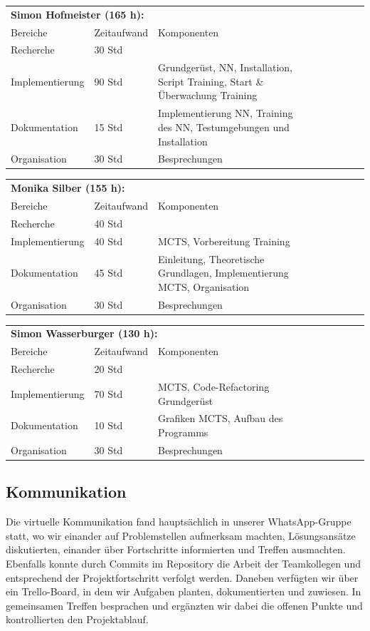 \documentclass[12pt,a4paper]{article}
\begin{document}
\begin{tabular}{*{3}{p{4cm}p{3cm}p{8cm}}}
\multicolumn{3}{l}{\textbf{Simon Hofmeister (165 h):}} \\
Bereiche & Zeitaufwand & Komponenten \\
\cline{1-3}
Recherche & 30 Std &  \\
Implementierung & 90 Std & Grundgerüst, NN, Installation, Script Training, Start \& Überwachung Training  \\
Dokumentation & 15 Std & Implementierung NN, Training des NN, Testumgebungen und Installation \\
Organisation & 30 Std &  Besprechungen\\
\end{tabular}


\begin{tabular}{*{3}{p{4cm}p{3cm}p{8cm}}}
\multicolumn{3}{l}{\textbf{Monika Silber (155 h):}} \\
Bereiche & Zeitaufwand & Komponenten \\
\cline{1-3}
Recherche & 40 Std &  \\
Implementierung & 40 Std & MCTS, Vorbereitung Training  \\
Dokumentation & 45 Std &  Einleitung, Theoretische Grundlagen, Implementierung MCTS, Organisation \\
Organisation & 30 Std &  Besprechungen\\
\end{tabular}


\begin{tabular}{*{3}{p{4cm}p{3cm}p{8cm}}}
\multicolumn{3}{l}{\textbf{Simon Wasserburger (130 h):}} \\
Bereiche & Zeitaufwand & Komponenten \\
\cline{1-3}
Recherche & 20 Std &  \\
Implementierung & 70 Std & MCTS, Code-Refactoring Grundgerüst  \\
Dokumentation & 10 Std &  Grafiken MCTS, Aufbau des Programms \\
Organisation & 30 Std &  Besprechungen\\
\end{tabular}

\subsection{Kommunikation}
Die virtuelle Kommunikation fand hauptsächlich in unserer WhatsApp-Gruppe statt, wo wir einander auf Problemstellen aufmerksam machten, Lösungsansätze diskutierten, einander über Fortschritte informierten und Treffen ausmachten. Ebenfalls konnte durch Commits im Repository die Arbeit der Teamkollegen und entsprechend der Projektfortschritt verfolgt werden. Daneben verfügten wir über ein Trello-Board, in dem wir Aufgaben planten, dokumentierten und zuwiesen. In gemeinsamen Treffen besprachen und ergänzten wir dabei die offenen Punkte und kontrollierten den Projektablauf. 
\end{document}
